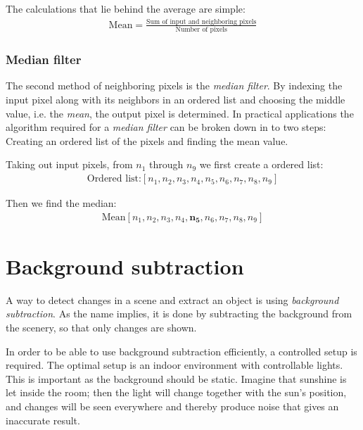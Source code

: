 {The calculations that lie behind the average are simple:
\begin{equation}
	\begin{aligned}
	\text{Mean} = \frac{\text{Sum of input and neighboring pixels}}{\text{Number of pixels}}
	\label{Mean filter}
	\end{aligned}
\end{equation}

\subsubsection{Median filter}
The second method of neighboring pixels is the \textit{median filter}. By indexing the input pixel along with its neighbors in an ordered list and choosing the middle value, i.e. the \textit{mean}, the output pixel is determined. In practical applications the algorithm required for a \textit{median filter} can be broken down in to two steps: Creating an ordered list of the pixels and finding the mean value.

Taking out input pixels, from $n_1$ through $n_9$ we first create a ordered list:
\begin{equation}
\begin{aligned}{
\text{Ordered list:}[n_1,n_2,n_3,n_4,n_5,n_6,n_7,n_8,n_9]
	\label{Order list of pixels.}}	
	\end{aligned}
\end{equation}

Then we find the median:
\begin{equation}
\begin{aligned}{
\text{Mean} [n_1,n_2,n_3,n_4,\boldsymbol{n_5},n_6,n_7,n_8,n_9]
	\label{Finding the mean pixel.}}
	\end{aligned}
\end{equation}

\section{Background subtraction}
A way to detect changes in a scene and extract an object is using \textit{background subtraction}. As the name implies, it is done by subtracting the background from the scenery, so that only changes are shown.

In order to be able to use background subtraction efficiently, a controlled setup is required. The optimal setup is an indoor environment with controllable lights. This is important as the background should be static. Imagine that sunshine is let inside the room; then the light will change together with the sun's position, and changes will be seen everywhere and thereby produce noise that gives an inaccurate result.

}
